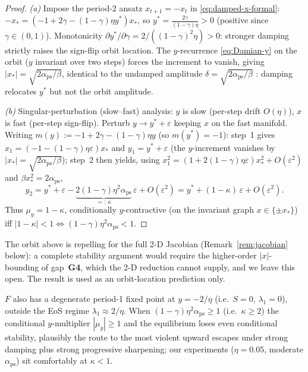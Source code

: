 \begin{proof}
\emph{(a)} Impose the period-2 ansatz $x_{t+1}=-x_{t}$ in
\eqref{eq:damped-x-formal}: $-x_{*}=(-1+2\gamma-(1-\gamma)\eta y^{*})x_{*}$, so
$y^{*}=\tfrac{2\gamma}{(1-\gamma)\eta}>0$ (positive since $\gamma\in(0,1)$).
Monotonicity $\partial y^{*}/\partial\gamma=2/((1-\gamma)^{2}\eta)>0$: stronger
damping strictly raises the sign-flip orbit location. The $y$-recurrence
\eqref{eq:Damian-y} on the orbit ($y$ invariant over two steps) forces the
increment to vanish, giving $|x_{*}|=\sqrt{2\alpha_{\mathrm{ps}}/\beta}$, identical to the
undamped amplitude $\delta=\sqrt{2\alpha_{\mathrm{ps}}/\beta}$ \citep{damian2023selfstab}:
damping relocates $y^{*}$ but not the orbit amplitude.

\emph{(b)} Singular-perturbation (slow--fast) analysis: $y$ is slow (per-step
drift $O(\eta)$), $x$ is fast (per-step sign-flip). Perturb $y\to y^{*}+\varepsilon$
keeping $x$ on the fast manifold. Writing $m(y):=-1+2\gamma-(1-\gamma)\eta y$
(so $m(y^{*})=-1$): step~1 gives $x_{1}=(-1-(1-\gamma)\eta\varepsilon)x_{*}$ and
$y_{1}=y^{*}+\varepsilon$ (the $y$-increment vanishes by
$|x_{*}|=\sqrt{2\alpha_{\mathrm{ps}}/\beta}$); step~2 then yields, using
$x_{1}^{2}=(1+2(1-\gamma)\eta\varepsilon)x_{*}^{2}+O(\varepsilon^{2})$ and
$\beta x_{*}^{2}=2\alpha_{\mathrm{ps}}$,
\begin{equation}
y_{2}=y^{*}+\varepsilon-\underbrace{2(1-\gamma)\eta^{2}\alpha_{\mathrm{ps}}}_{=:\,\kappa}\,\varepsilon
+O(\varepsilon^{2})=y^{*}+(1-\kappa)\,\varepsilon+O(\varepsilon^{2}).
\label{eq:mustar}
\end{equation}
Thus $\mu_{y}=1-\kappa$, conditionally $y$-contractive (on the invariant graph
$x\in\{\pm x_{*}\}$) iff $|1-\kappa|<1\iff
(1-\gamma)\eta^{2}\alpha_{\mathrm{ps}}<1$.
\end{proof}

\begin{remark}
\label{rem:scope}
The orbit above is repelling for the full 2-D Jacobian
(Remark~\ref{rem:jacobian} below): a complete stability argument would
require the higher-order $|x|$-bounding of gap~\textbf{G4}, which the
2-D reduction cannot supply, and we leave this open. The result is
used as an orbit-location prediction only.
\end{remark}

\begin{remark}
\label{rem:degenerate}
$F$ also has a degenerate period-1 fixed point at $y=-2/\eta$ (i.e.\ $S=0$,
$\lambda_{1}=0$), outside the EoS regime $\lambda_{1}\approx2/\eta$. When
$(1-\gamma)\eta^{2}\alpha_{\mathrm{ps}}\ge1$ (i.e.\ $\kappa\ge2$) the conditional
$y$-multiplier $|\mu_{y}|\ge1$ and the equilibrium loses even conditional
stability, plausibly the route to the most violent upward escapes under strong
damping plus strong progressive sharpening; our experiments ($\eta{=}0.05$,
moderate $\alpha_{\mathrm{ps}}$) sit comfortably at $\kappa<1$.
\end{remark}

